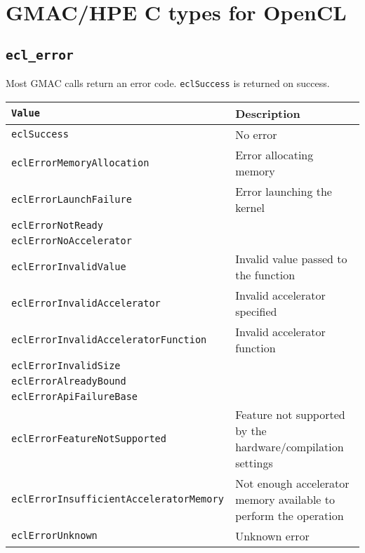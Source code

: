 \section{GMAC\slash HPE C types for OpenCL}

\subsection{\texttt{ecl\_error}}
Most GMAC calls return an error code. \texttt{eclSuccess} is returned on success.
\vspace{11pt}\\
\begin{tabularx}{\linewidth}{|>{\texttt\bgroup}l<{\egroup}|X|}
  \hline
  \textnormal{Value} & Description \\
  \hline
  \hline
  eclSuccess                            & No error                             \\
  eclErrorMemoryAllocation              & Error allocating memory              \\
  eclErrorLaunchFailure                 & Error launching the kernel           \\
  eclErrorNotReady                      &                                      \\
  eclErrorNoAccelerator                 &                                      \\
  eclErrorInvalidValue                  & Invalid value passed to the function \\
  eclErrorInvalidAccelerator            & Invalid accelerator specified        \\
  eclErrorInvalidAcceleratorFunction    & Invalid accelerator function         \\
  eclErrorInvalidSize                   &                                      \\
  eclErrorAlreadyBound                  &                                      \\
  eclErrorApiFailureBase                &                                      \\
  eclErrorFeatureNotSupported           & Feature not supported by the hardware\slash{}compilation
                                          settings                             \\
  eclErrorInsufficientAcceleratorMemory & Not enough accelerator memory available to perform the 
                                          operation                            \\
  eclErrorUnknown                       & Unknown error                        \\
  \hline
\end{tabularx}

